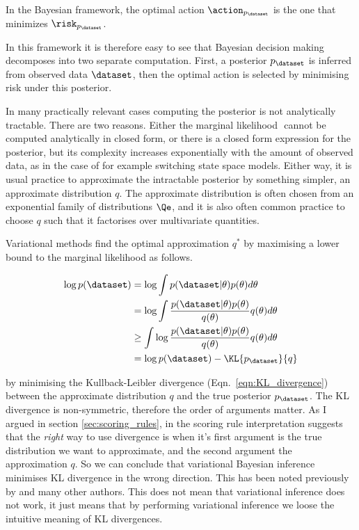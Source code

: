 In the Bayesian framework, the optimal action $\action_{p_\dataset}$ is the one that minimizes $\risk_{p_\dataset}$.



In this framework it is therefore easy to see that Bayesian decision making decomposes into two separate computation. First, a posterior $p_\dataset$ is inferred from observed data $\dataset$, then the optimal action is selected by minimising risk under this posterior.

In many practically relevant cases computing the posterior is not analytically tractable. There are two reasons. Either the marginal likelihood $ $
cannot be computed analytically in closed form, or there is a closed form expression for the posterior, but its complexity increases exponentially with the amount of observed data, as in the case of for example switching state space models. Either way, it is usual practice to approximate the intractable posterior by something simpler, an approximate distribution $q$. The approximate distribution is often chosen from an exponential family of distributions $\Qe$, and it is also often common practice to choose $q$ such that it factorises over multivariate quantities.

Variational methods find the optimal approximation $q^{*}$ by maximising a lower bound to the marginal likelihood as follows.

\begin{align}
	\log p(\dataset) &= \log \int p(\dataset\vert\theta)p(\theta) d\theta\\
		&=\log \int \frac{p(\dataset\vert\theta)p(\theta)}{q(\theta)}q(\theta) d\theta\\
		&\geq \int \log \frac{p(\dataset\vert\theta)p(\theta)}{q(\theta)} q(\theta) d\theta\\
		&= \log p(\dataset) - \KL{p_{\dataset}}{q}
\end{align}

by minimising the Kullback-Leibler divergence (Eqn.\ \eqref{eqn:KL_divergence}) between the approximate distribution $q$ and the true posterior $p_{\dataset}$. The KL divergence is non-symmetric, therefore the order of arguments matter. As I argued in section \ref{sec:scoring_rules}, in the scoring rule interpretation suggests that the \emph{right} way to use divergence is when it's first argument is the true distribution we want to approximate, and the second argument the approximation $q$. So we can conclude that variational Bayesian inference minimises KL divergence in the wrong direction. This has been noted previously by \cite{CsatoOpper,Minka} and many other authors. This does not mean that variational inference does not work, it just means that by performing variational inference we loose the intuitive meaning of KL divergences.

